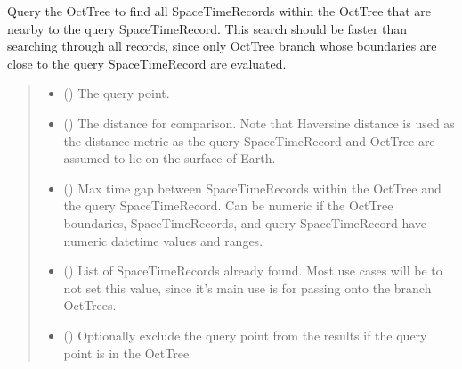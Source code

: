 \documentclass[letterpaper,10pt,english]{sphinxmanual}
\begin{document}
\begin{fulllineitems}
\begin{fulllineitems}
\sphinxAtStartPar
Query the OctTree to find all SpaceTimeRecords within the OctTree that
are nearby to the query SpaceTimeRecord. This search should be faster
than searching through all records, since only OctTree branch whose
boundaries are close to the query SpaceTimeRecord are evaluated.
\begin{quote}\begin{description}
\begin{itemize}
\item {}
\sphinxAtStartPar
{} ({\hyperref[\detokenize{record:geotrees.record.SpaceTimeRecord}]{}}) \textendash{} The query point.

\item {}
\sphinxAtStartPar
{} () \textendash{} The distance for comparison. Note that Haversine distance is used
as the distance metric as the query SpaceTimeRecord and OctTree are
assumed to lie on the surface of Earth.

\item {}
\sphinxAtStartPar
{} () \textendash{} Max time gap between SpaceTimeRecords within the OctTree and the
query SpaceTimeRecord. Can be numeric if the OctTree boundaries,
SpaceTimeRecords, and query SpaceTimeRecord have numeric datetime
values and ranges.

\item {}
\sphinxAtStartPar
{} (\sphinxstyleliteralemphasis{\sphinxupquote{{[}}}{\hyperref[\detokenize{record:geotrees.record.SpaceTimeRecord}]{\sphinxcrossref{\sphinxstyleliteralemphasis{\sphinxupquote{SpaceTimeRecord}}}}}\sphinxstyleliteralemphasis{\sphinxupquote{{]} }}\sphinxstyleliteralemphasis{\sphinxupquote{| }}) \textendash{} List of SpaceTimeRecords already found. Most use cases will be to
not set this value, since it’s main use is for passing onto the
branch OctTrees.

\item {}
\sphinxAtStartPar
{} () \textendash{} Optionally exclude the query point from the results if the query
point is in the OctTree


\end{itemize}
\end{description}
\end{quote}
\end{fulllineitems}
\end{fulllineitems}
\end{document}

